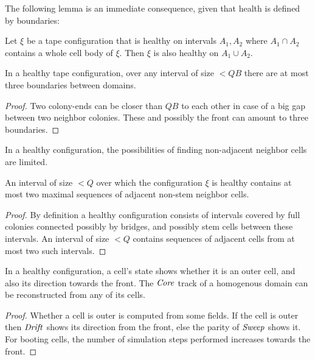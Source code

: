 \documentclass[11pt]{memoir}
\theoremstyle{definition} %
\newtheorem{Premark}{\color{cyan}Peter remark}
\newenvironment{premark}{\begin{Premark}\color{cyan}}{\varqed\end{Premark}}
\newcommand{\fld}[1]{\ensuremath{\textit{#1\/}}}
\def\B{B}
\newcommand{\Q}{Q} %
\newcommand{\Core}{\fld{Core}}
\newcommand{\Drift}{\fld{Drift}}
\newcommand{\Sweep}{\fld{Sweep}} %
\begin{document}
The following lemma is an immediate consequence, given that health is defined by boundaries:

\begin{lemma}\label{lem:health-extension}
  Let \( \xi \) be a tape configuration that is healthy on intervals \( A_{1}, A_{2} \) 
where \( A_{1}\cap A_{2} \) contains a whole cell body of \( \xi \).
Then \( \xi \) is also healthy on \( A_{1}\cup A_{2} \).
\end{lemma}


\begin{lemma}\label{lem:3-boundaries}
  In a healthy tape configuration, over any interval of size \( <\Q\B \) there are at most three boundaries between
  domains.
\end{lemma}
\begin{proof}
  Two colony-ends can be closer than \( \Q\B \) to each other in case of a big gap between
  two neighbor colonies.
  These and possibly the front can amount to three boundaries.
\end{proof}

In a healthy configuration, the possibilities of finding non-adjacent neighbor
cells are limited.

\begin{lemma}\label{lem:two-domains}
  An interval of size \( <\Q \) over which the configuration \( \xi \) is healthy
contains at most two maximal sequences of adjacent non-stem neighbor cells.
\end{lemma}
\begin{proof}
  By definition a healthy configuration consists of intervals covered by
  full colonies connected possibly by bridges, and possibly stem cells between these intervals.
An interval of size \( <\Q \) contains sequences of adjacent cells 
from at most two such intervals.
\end{proof}

\begin{lemma}\label{lem:infer-between}
In a healthy configuration, 
a cell's state shows whether it is an outer cell, and also its direction towards the front.
The \( \Core \) track of a homogenous domain can be reconstructed from any of its cells.
\end{lemma}
\begin{proof}
Whether a cell is outer is computed from some fields.
If the cell is outer then \( \Drift \) shows its direction from the front,
else the parity of \( \Sweep \) shows it.
For booting cells, the number of simulation steps performed increases towards the front.
\end{proof}
\end{document}

